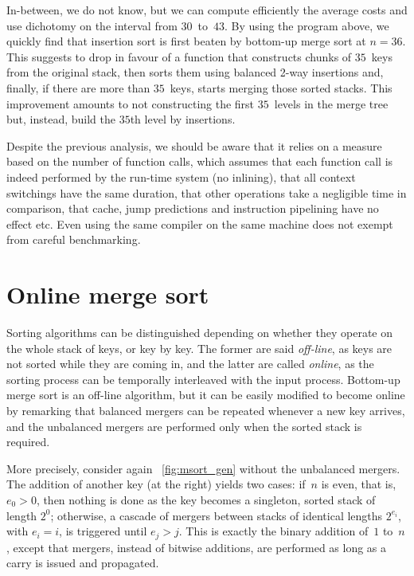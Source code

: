 In\hyp{}between, we do not know, but we can compute efficiently the
average costs and use dichotomy on the interval from
\(30\)~to~\(43\). By using the \Erlang program above, we quickly find
that insertion sort is first beaten by bottom\hyp{}up merge sort at
\(n=36\). This suggests to drop  in favour of a function
that constructs chunks of \(35\)~keys from the original stack, then
sorts them using balanced 2-way insertions and, finally, if there are
more than \(35\)~keys, starts merging those sorted stacks. This
improvement amounts to not constructing the first \(35\)~levels in the
merge tree but, instead, build the \(35\)th
level by insertions.

Despite the previous analysis, we should be aware that it relies on a
measure based on the number of function calls, which assumes that each
function call is indeed performed by the run\hyp{}time system (no
inlining), that all context switchings have the same duration, that
other operations take a negligible time in comparison, that cache,
jump predictions and instruction pipelining have no effect etc. Even
using the same compiler on the same machine does not exempt from
careful benchmarking.


\section{Online merge sort}
\label{sec:online}

Sorting algorithms can be distinguished depending on whether they
operate on the whole stack of keys, or key by key. The former are said
\emph{off\hyp{}line}, as keys are not sorted while they are coming in,
and the latter are called \emph{online}, as the sorting process
can be temporally interleaved with the input process. Bottom\hyp{}up
merge sort is an off\hyp{}line algorithm, but it can be easily
modified to become online by remarking that balanced mergers
can be repeated whenever a new key arrives, and the unbalanced
mergers are performed only when the sorted stack is required.

More precisely, consider again \fig~\ref{fig:msort_gen}
 without the unbalanced mergers. The addition
of another key (at the right) yields two cases: if~\(n\) is even, that
is, \(e_0>0\), then nothing is done as the key becomes a singleton,
sorted stack of length \(2^0\); otherwise, a cascade of mergers
between stacks of identical lengths \(2^{e_i}\), with \(e_i=i\), is
triggered until \(e_j > j\). This is exactly the binary addition
of~\(1\) to~\(n\), except that mergers, instead of bitwise additions,
are performed as long as a carry is issued and propagated.

